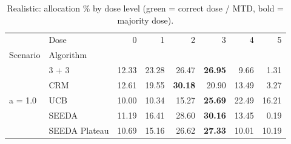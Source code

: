 \begin{table}[H]
\centering
\caption{Realistic: allocation \% by dose level (green = correct dose / MTD, bold = majority dose).}
\label{tab:real_alloc_by_dose}
\begin{tabular}{llrrrrrr}
\toprule
 & Dose & 0 & 1 & 2 & 3 & 4 & 5 \\
Scenario & Algorithm &  &  &  &  &  &  \\
\midrule
\multirow[c]{5}{*}{a = 1.0} & 3 + 3 & 12.33 & 23.28 & {\cellcolor[HTML]{C8E6C9}} 26.47 & \bfseries 26.95 & 9.66 & 1.31 \\
 & CRM & 12.61 & 19.55 & {\cellcolor[HTML]{C8E6C9}} \bfseries 30.18 & 20.90 & 13.49 & 3.27 \\
 & UCB & 10.00 & 10.34 & {\cellcolor[HTML]{C8E6C9}} 15.27 & \bfseries 25.69 & 22.49 & 16.21 \\
 & SEEDA & 11.19 & 16.41 & {\cellcolor[HTML]{C8E6C9}} 28.60 & \bfseries 30.16 & 13.45 & 0.19 \\
 & SEEDA Plateau & 10.69 & 15.16 & {\cellcolor[HTML]{C8E6C9}} 26.62 & \bfseries 27.33 & 10.01 & 10.19 \\
\bottomrule
\end{tabular}
\end{table}
